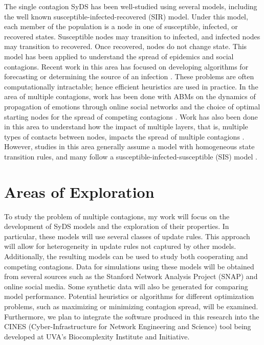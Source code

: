\documentclass[11pt]{article}
\begin{document}
 The single contagion SyDS has been well-studied using several models, including the well known susceptible-infected-recovered (SIR) model. Under this model, each member of the population is a node in one of susceptible, infected, or recovered states. Susceptible nodes may transition to infected, and infected nodes may transition to recovered. Once recovered, nodes do not change state. This model has been applied to understand the spread of epidemics and social contagions. Recent work in this area has focused on developing algorithms for forecasting or determining the source of an infection \cite{Adiga-etal-2019}. These problems are often computationally intractable; hence efficient heuristics are used in practice. In the area of multiple contagions, work has been done with ABMs on the dynamics of propagation of emotions through online social networks and the choice of optimal starting nodes for the spread of competing contagions \cite{Kumar-etal-2019, emotion-contagion}. Work has also been done in this area to understand how the impact of multiple layers, that is, multiple types of contacts between nodes, impacts the spread of multiple contagions \cite{emotion-contagion}. However, studies in this area generally assume a model with homogeneous state transition rules, and many follow a susceptible-infected-susceptible (SIS) model \cite{Kumar-etal-2019, emotion-contagion, jovanovski-multilayer, stanoev-multicontagion}.

 \section{Areas of Exploration}\label{sec:areas}
 
 To study the problem of multiple contagions, my work will focus on the development of SyDS models and the exploration of their properties. In particular, these models will use several classes of update rules. This approach will allow for heterogeneity in update rules not captured by other models. Additionally, the resulting models can be used to study both cooperating and competing contagions. Data for simulations using these models will be obtained from several sources such as the Stanford Network Analysis Project (SNAP) and online social media. Some synthetic data will also be generated for comparing model performance.  Potential heuristics or algorithms for different optimization problems, such as maximizing or minimizing contagion spread, will be examined. Furthermore, we plan to integrate the software produced in this research into the CINES (Cyber-Infrastructure for Network Engineering and Science) tool being developed at UVA's Biocomplexity Institute and Initiative. 



\end{document}
